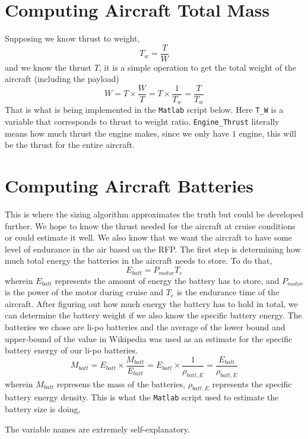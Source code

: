 \documentclass[letter, 12pt]{article}
\begin{document}
\begin{center}
\section{Computing Aircraft Total Mass}
\begin{comment}
\end{comment}
Supposing we know thrust to weight,
$$T_{w} = \frac{T}{W}$$
and we know the thrust $T$, it is a simple operation to get the total weight of the aircraft (including the payload)
$$W = T\times \frac{W}{T} = T\times \frac{1}{T_{w}} = \frac{T}{T_{w}}$$
That is what is being implemented in the \texttt{Matlab} script below. Here \texttt{T\_W} is a variable that corresponds to thrust to weight ratio. \texttt{Engine\_Thrust} literally means how much thrust the engine makes, since we only have $1$ engine, this will be the thrust for the entire aircraft.


\section{Computing Aircraft Batteries}
\begin{comment}
\end{comment}
This is where the sizing algorithm approximates the truth but could be developed further. We hope to know the thrust needed for the aircraft at cruise conditions or could estimate it well. We also know that we want the aircraft to have some level of endurance in the air based on the RFP. The first step is determining how much total energy the batteries in the aircraft needs to store. To do that,
$$E_{batt} = P_{motor}T_{e}$$
wherein $E_{batt}$ represents the amount of energy the battery has to store, and $P_{motor}$ is the power of the motor during cruise and $T_{e}$ is the endurance time of the aircraft. After figuring out how much energy the battery has to hold in total, we can determine the battery weight if we also know the specific battery energy. The batteries we chose are li-po batteries and the average of the lower bound and upper-bound of the value in Wikipedia was used as an estimate for the specific battery energy of our li-po batteries.
$$M_{batt} = E_{batt} \times \frac{M_{batt}}{E_{batt}} = E_{batt} \times \frac{1}{\rho_{batt,E}} = \frac{E_{batt}}{\rho_{batt,E}}$$
wherein $M_{batt}$ represens the mass of the batteries, $\rho_{batt,E}$ represents the specific battery energy density. This is what the \texttt{Matlab} script used to estimate the battery size is doing,

The variable names are extremely self-explanatory.


\end{center}
\end{document}
